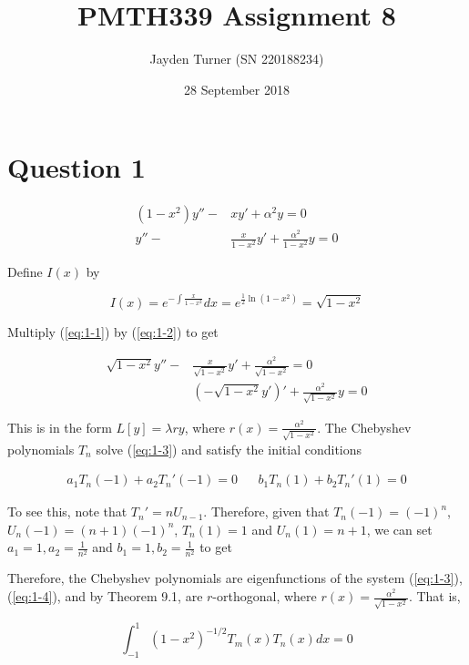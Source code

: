 \documentclass{article}
\title{PMTH339 Assignment 8}
\date{28 September 2018}
\author{Jayden Turner (SN 220188234)}
\begin{document}
\maketitle
{}

\section*{Question 1}

\begin{align}
    (1 - x^2)y'' -& xy' + \alpha^2y = 0\nonumber\\
    y'' -& \frac{x}{1 - x^2}y' + \frac{\alpha^2}{1 - x^2}y = 0 \label{eq:1-1}
\end{align}

Define $I(x)$ by

\begin{equation} \label{eq:1-2}
    I(x) = e^{-\int \frac{x}{1 - x^2}}dx = e^{\frac{1}{2}\ln(1 - x^2)} = \sqrt{1 - x^2}
\end{equation}

Multiply (\ref{eq:1-1}) by (\ref{eq:1-2}) to get

\begin{align}
    \sqrt{1 - x^2}y'' -& \frac{x}{\sqrt{1 - x^2}}y' + \frac{\alpha^2}{\sqrt{1 - x^2}} = 0\nonumber\\
    &(-\sqrt{1 - x^2}y')' + \frac{\alpha^2}{\sqrt{1 - x^2}}y = 0 \label{eq:1-3}
\end{align}

This is in the form $L[y] = \lambda ry$, where $r(x) = \frac{\alpha^2}{\sqrt{1 - x^2}}$.
The Chebyshev polynomials $T_n$ solve (\ref{eq:1-3}) and satisfy the initial conditions

\begin{align} \label{eq:1-4}
    a_1T_n(-1) + a_2T_n'(-1) = 0 && b_1T_n(1) + b_2T_n'(1) = 0
\end{align}

To see this, note that $T_n' = nU_{n - 1}$. Therefore, given that
$T_n(-1) = (-1)^n$, $U_n(-1) = (n + 1)(-1)^n$, $T_n(1) = 1$ and $U_n(1) = n + 1$, we can set
$a_1 = 1, a_2 = \frac{1}{n^2}$ and $b_1 = 1, b_2 = \frac{1}{n^2}$ to get

Therefore, the Chebyshev polynomials are eigenfunctions of the system (\ref{eq:1-3}), (\ref{eq:1-4}),
and by Theorem 9.1, are $r$-orthogonal, where $r(x) = \frac{\alpha^2}{\sqrt{1 - x^2}}$. That is,

\begin{equation*}
    \int_{-1}^1 (1 - x^2)^{-1/2}T_m(x)T_n(x) dx = 0
\end{equation*}
\end{document}
